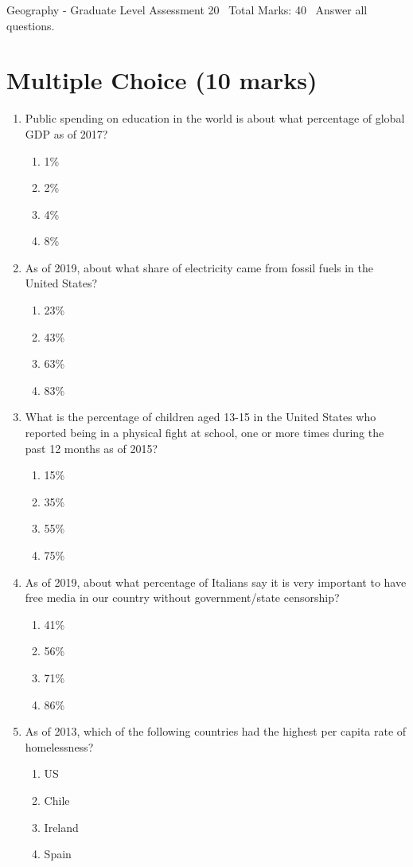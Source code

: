 \documentclass[12pt]{article}
\begin{document}
\begin{center}
Geography - Graduate Level Assessment 20 \
Total Marks: 40 \
Answer all questions.
\end{center}

\section*{Multiple Choice (10 marks)}
\begin{enumerate}[label=\arabic*.]
\item Public spending on education in the world is about what percentage of global GDP as of 2017?
\begin{enumerate}[label=(\alph*)]
    \item 1\%
    \item 2\%
    \item 4\%
    \item 8\%
\end{enumerate}
\item As of 2019, about what share of electricity came from fossil fuels in the United States?
\begin{enumerate}[label=(\alph*)]
    \item 23\%
    \item 43\%
    \item 63\%
    \item 83\%
\end{enumerate}
\item What is the percentage of children aged 13-15 in the United States who reported being in a physical fight at school, one or more times during the past 12 months as of 2015?
\begin{enumerate}[label=(\alph*)]
    \item 15\%
    \item 35\%
    \item 55\%
    \item 75\%
\end{enumerate}
\item As of 2019, about what percentage of Italians say it is very important to have free media in our country without government/state censorship?
\begin{enumerate}[label=(\alph*)]
    \item 41\%
    \item 56\%
    \item 71\%
    \item 86\%
\end{enumerate}
\item As of 2013, which of the following countries had the highest per capita rate of homelessness?
\begin{enumerate}[label=(\alph*)]
    \item US
    \item Chile
    \item Ireland
    \item Spain
\end{enumerate}
\end{enumerate}
\end{document}
